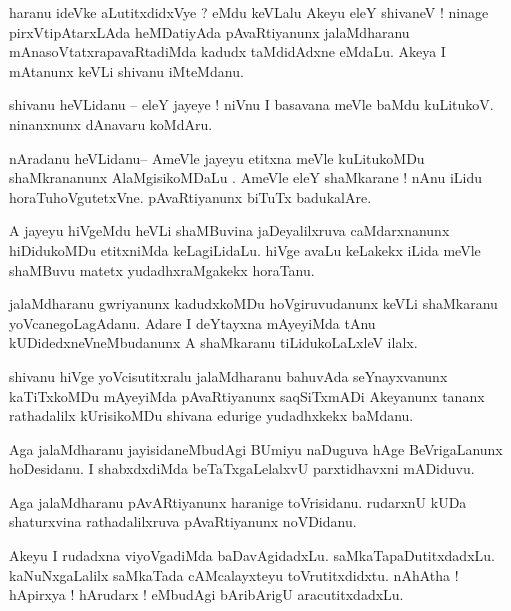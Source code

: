 \documentclass{article}
\begin{document}
\begin{mn}%
haranu ideVke aLutitxdidxVye ? eMdu keVLalu Akeyu eleY shivaneV ! ninage pirxVtipAtarxLAda 
heMDatiyAda pAvaRtiyanunx jalaMdharanu mAnasoVtatxrapavaRtadiMda kadudx taMdidAdxne eMdaLu. 
Akeya I mAtanunx keVLi shivanu iMteMdanu.
\end{mn}

\begin{mn}%
shivanu heVLidanu -- eleY jayeye ! niVnu I basavana meVle baMdu kuLitukoV. ninanxnunx 
dAnavaru koMdAru.
\end{mn}

\begin{mn}%
nAradanu heVLidanu-- AmeVle jayeyu etitxna meVle kuLitukoMDu shaMkrananunx AlaMgisikoMDaLu . 
AmeVle eleY shaMkarane ! nAnu iLidu horaTuhoVgutetxVne. pAvaRtiyanunx biTuTx badukalAre.
\end{mn}

\begin{mn}%
A jayeyu hiVgeMdu heVLi shaMBuvina jaDeyalilxruva caMdarxnanunx hiDidukoMDu etitxniMda 
keLagiLidaLu. hiVge avaLu keLakekx iLida meVle shaMBuvu matetx yudadhxraMgakekx horaTanu.
\end{mn}

\begin{mn}%
jalaMdharanu gwriyanunx kadudxkoMDu hoVgiruvudanunx keVLi shaMkaranu yoVcanegoLagAdanu. 
Adare I deYtayxna mAyeyiMda tAnu kUDidedxneVneMbudanunx A shaMkaranu tiLidukoLaLxleV ilalx.
\end{mn}

\begin{mn}%
shivanu hiVge yoVcisutitxralu jalaMdharanu bahuvAda seYnayxvanunx kaTiTxkoMDu mAyeyiMda 
pAvaRtiyanunx saqSiTxmADi Akeyanunx tananx rathadalilx kUrisikoMDu shivana edurige 
yudadhxkekx baMdanu.
\end{mn}

\begin{mn}%
Aga jalaMdharanu jayisidaneMbudAgi BUmiyu naDuguva hAge BeVrigaLanunx hoDesidanu. I 
shabxdxdiMda beTaTxgaLelalxvU parxtidhavxni mADiduvu.
\end{mn}

\begin{mn}%
Aga jalaMdharanu pAvARtiyanunx haranige toVrisidanu. rudarxnU kUDa shaturxvina 
rathadalilxruva pAvaRtiyanunx noVDidanu.
\end{mn}

\begin{mn}%
Akeyu I rudadxna viyoVgadiMda baDavAgidadxLu. saMkaTapaDutitxdadxLu. kaNuNxgaLalilx 
saMkaTada cAMcalayxteyu toVrutitxdidxtu. nAhAtha ! hApirxya ! hArudarx ! eMbudAgi 
bAribArigU aracutitxdadxLu.
\end{mn}
\end{document}

